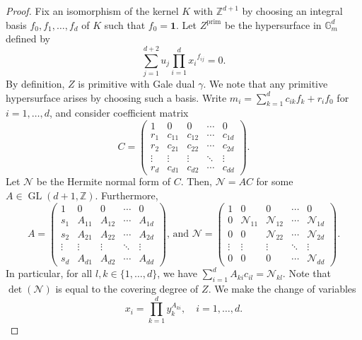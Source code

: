 \documentclass[11pt, reqno]{amsart}
\theoremstyle{plain}
\theoremstyle{definition}
\newcommand{\G}{\mathbb{G}}
\begin{document}
\begin{proof}
Fix an isomorphism of the kernel $K$ with $\mathbb{Z}^{d+1}$ by choosing an integral basis $f_0,f_1,\dots,f_{d}$ of $K$ such that $f_0 = \mathbf{1}$.
Let $Z^{\mathrm{prim}}$ be the hypersurface in $\G_m^{d}$ defined by
\begin{equation}\label{eq:primitive-coefficients}
\sum_{j=1}^{d+2} u_j \prod_{i=1}^d {x_i}^{f_{ij}}=0.   
\end{equation}
By definition, $Z$ is primitive with Gale dual $\gamma$. We note that any primitive hypersurface arises by choosing such a basis.  
Write $m_i = \sum_{k=1}^d c_{ik} f_k +r_i f_0$ for $i=1,\dots,d$, and consider coefficient matrix
\[
C=\begin{pmatrix}
1 & 0 & 0 & \cdots & 0 \\
r_1&c_{11} & c_{12} & \cdots & c_{1d} \\
r_2 & c_{21} & c_{22} & \cdots & c_{2d} \\
\vdots & \vdots & \vdots & \ddots & \vdots \\
r_d & c_{d1} & c_{d2} & \cdots & c_{dd}
\end{pmatrix}.
\]
Let $\mathcal{N}$ be the Hermite normal form of $C$. Then, $\mathcal{N} = A C$ for some $A \in \operatorname{GL}(d+1,\mathbb{Z})$. Furthermore,
\[
A=\begin{pmatrix}
1 & 0 & 0 & \cdots & 0 \\
s_1& A_{11} & A_{12} & \cdots & A_{1d} \\
s_2 & A_{21} & A_{22} & \cdots & A_{2d} \\
\vdots & \vdots & \vdots & \ddots & \vdots \\
s_d & A_{d1} & A_{d2} & \cdots & A_{dd}
\end{pmatrix}\text{, and }
\mathcal{N}=\begin{pmatrix}
1 & 0 & 0 & \cdots & 0 \\
0& \mathcal{N}_{11} & \mathcal{N}_{12} & \cdots & \mathcal{N}_{1d} \\
0 & 0 & \mathcal{N}_{22} & \cdots & \mathcal{N}_{2d} \\
\vdots & \vdots & \vdots & \ddots & \vdots \\
0 & 0 & 0 & \cdots & \mathcal{N}_{dd}
\end{pmatrix}.
\]
In particular, for all $l,k \in \{1,\dots,d\}$, we have $\sum_{i=1}^d A_{ki}c_{il} = \mathcal{N}_{kl}$. 
Note that $\det(\mathcal{N})$ is equal to the covering degree of $Z$.
We make the change of variables
\[
x_i= \prod_{k=1}^d y_k^{A_{ki}}, \quad i=1, \dots, d.
\]
\begingroup

\end{proof}
\end{document}
